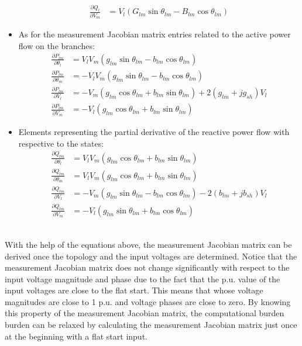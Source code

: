 \begin{itemize}
\begin{align}
            \frac{\partial Q_{l}}{\partial V_m} &= V_l \left(G_{lm}\sin\theta_{lm}-B_{lm}\cos\theta_{lm} \right) 
    	    \label{eq:Q_inj_theta_m}     	    
        \end{align}
    \item As for the measurement Jacobian matrix entries related to the active power flow on the branches:
        \begin{align} 
    	    \frac{\partial P_{lm}}{\partial \theta_l} &= V_l V_m \left(g_{lm}\sin{\theta_{lm}}-b_{lm}\cos{\theta_{lm}}\right)
   	        \label{eq:P_lm_theta_l} \\[1pt]
       	    \frac{\partial P_{lm}}{\partial \theta_m} &= -V_l V_m \left(g_{lm}\sin{\theta_{lm}}-b_{lm}\cos{\theta_{lm}}\right)
   	        \label{eq:P_lm_theta_m} \\[1pt]
       	    \frac{\partial P_{lm}}{\partial V_l} &= -V_m \left(g_{lm}\cos{\theta_{lm}}+b_{lm}\sin{\theta_{lm}}\right)+2\left(g_{lm}+jg_{sh} \right)V_l
   	        \label{eq:P_lm_V_l} \\[1pt]
      	    \frac{\partial P_{lm}}{\partial V_m} &= -V_l \left(g_{lm}\cos{\theta_{lm}}+b_{lm}\sin{\theta_{lm}}\right)
   	        \label{eq:P_lm_V_m}
        \end{align}        
    \item Elements representing the partial derivative of the reactive power flow with respective to the states:
        \begin{align} 
    	    \frac{\partial Q_{lm}}{\partial \theta_l} &= V_l V_m \left(g_{lm}\cos{\theta_{lm}}+b_{lm}\sin{\theta_{lm}}\right)
   	        \label{eq:Q_lm_theta_l} \\[1pt]
       	    \frac{\partial Q_{lm}}{\partial \theta_m} &= V_l V_m \left(g_{lm}\cos{\theta_{lm}}+b_{lm}\sin{\theta_{lm}}\right)
   	        \label{eq:Q_lm_theta_m} \\[1pt]
       	    \frac{\partial Q_{lm}}{\partial V_l} &= -V_m \left(g_{lm}\sin{\theta_{lm}}-b_{lm}\cos{\theta_{lm}}\right)-2\left(b_{lm}+jb_{sh} \right)V_l
   	        \label{eq:Q_lm_V_l} \\[1pt]
      	    \frac{\partial Q_{lm}}{\partial V_m} &= -V_l \left(g_{lm}\sin{\theta_{lm}}+b_{lm}\cos{\theta_{lm}}\right)
   	        \label{eq:Q_lm_V_m}
        \end{align}     
    
\end{itemize}
\\With the help of the equations above, the measurement Jacobian matrix can be derived once the topology and the input voltages are determined. Notice that the measurement Jacobian matrix does not change significantly with respect to the input voltage magnitude and phase due to the fact that the p.u. value of the input voltages are close to the flat start. This means that whose voltage magnitudes are close to 1 p.u. and voltage phases are close to zero. By knowing this property of the measurement Jacobian matrix, the computational burden burden can be relaxed by calculating the measurement Jacobian matrix just once at the beginning with a flat start input.

